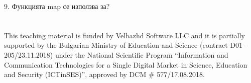 \documentclass[a4paper,12pt]{minimal}
\begin{document}
\begin{Form}[action=mailto:todor.balabanov@gmail.com,encoding=text,method=post]
9. Функцията map се използва за?
\\

\\ \\

{\ssmall This teaching material is funded by Velbazhd Software LLC and it is partially supported by the Bulgarian Ministry of Education and Science (contract D01–205/23.11.2018) under the National Scientific Program ``Information and Communication Technologies for a Single Digital Market in Science, Education and Security (ICTinSES)'', approved by DCM \# 577/17.08.2018.}

\end{Form}
\end{document}
